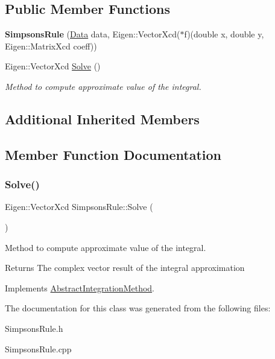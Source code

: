 \subsection*{Public Member Functions}
\begin{DoxyCompactItemize}
\item 
\mbox{\label{class_simpsons_rule_af880433d19d6041cdedb081b542a195b}} 
{\bfseries Simpsons\+Rule} (\hyperlink{struct_data}{Data} data, Eigen\+::\+Vector\+Xcd($\ast$f)(double x, double y, Eigen\+::\+Matrix\+Xcd coeff))
\item 
Eigen\+::\+Vector\+Xcd \hyperlink{class_simpsons_rule_a9925b07e44be9fc1644d3cbeb742078c}{Solve} ()
\begin{DoxyCompactList}\small\item\em Method to compute approximate value of the integral. \end{DoxyCompactList}\end{DoxyCompactItemize}
\subsection*{Additional Inherited Members}


\subsection{Member Function Documentation}
\mbox{\label{class_simpsons_rule_a9925b07e44be9fc1644d3cbeb742078c}} 
\subsubsection{\texorpdfstring{Solve()}{Solve()}}
{\footnotesize\ttfamily Eigen\+::\+Vector\+Xcd Simpsons\+Rule\+::\+Solve (\begin{DoxyParamCaption}{ }\end{DoxyParamCaption})\hspace{0.3cm}{\ttfamily [virtual]}}



Method to compute approximate value of the integral. 

\begin{DoxyReturn}{Returns}
The complex vector result of the integral approximation 
\end{DoxyReturn}


Implements \hyperlink{class_abstract_integration_method_af76e5bdce7d0b139d07e920fa29c1c34}{Abstract\+Integration\+Method}.



The documentation for this class was generated from the following files\+:\begin{DoxyCompactItemize}
\item 
Simpsons\+Rule.\+h\item 
Simpsons\+Rule.\+cpp\end{DoxyCompactItemize}
